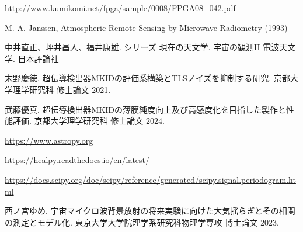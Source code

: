 \begin{thebibliography}{99}
\href{http://www.kumikomi.net/fpga/sample/0008/FPGA08\_042.pdf}{http://www.kumikomi.net/fpga/sample/0008/FPGA08\_042.pdf}


M. A. Janssen, Atmospheric Remote Sensing by Microwave Radiometry (1993)

中井直正、坪井昌人、福井康雄. シリーズ  現在の天文学. 宇宙の観測I\hspace{-1.2pt}I  電波天文学. 日本評論社

末野慶徳. 超伝導検出器MKIDの評価系構築とTLSノイズを抑制する研究. 京都大学理学研究科 修士論文 2021.

武藤優真. 超伝導検出器MKIDの薄膜純度向上及び高感度化を目指した製作と性能評価. 京都大学理学研究科 修士論文 2024.

\href{https://www.astropy.org}{https://www.astropy.org}

\href{https://healpy.readthedocs.io/en/latest/}{https://healpy.readthedocs.io/en/latest/}

\href{https://docs.scipy.org/doc/scipy/reference/generated/scipy.signal.periodogram.html}{https://docs.scipy.org/doc/scipy/reference/generated/scipy.signal.periodogram.html}

西ノ宮ゆめ. 宇宙マイクロ波背景放射の将来実験に向けた大気揺らぎとその相関の測定とモデル化. 東京大学大学院理学系研究科物理学専攻 博士論文 2023.


\end{thebibliography}
